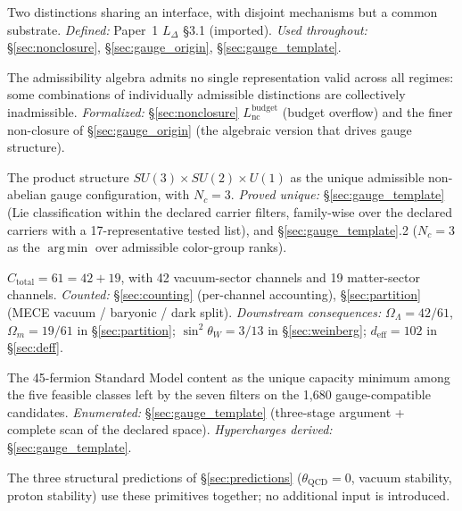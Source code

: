 \documentclass[11pt]{article}
\DeclareMathOperator*{\argmin}{arg\,min}
\begin{document}
\begin{tcolorbox}[apfbox, title={Operational primitives: where each structural term is defined and used}]
\begin{description}[topsep=2pt,itemsep=2pt]
  \item[Co-located distinctions.]  Two distinctions sharing an interface, with disjoint mechanisms but a common substrate.  \emph{Defined:} Paper~1 $L_\Delta$ \S 3.1 (imported).  \emph{Used throughout:} \S\ref{sec:nonclosure}, \S\ref{sec:gauge_origin}, \S\ref{sec:gauge_template}.
  \item[Non-closure.]  The admissibility algebra admits no single representation valid across all regimes: some combinations of individually admissible distinctions are collectively inadmissible.  \emph{Formalized:} \S\ref{sec:nonclosure} $L_{\mathrm{nc}}^{\mathrm{budget}}$ (budget overflow) and the finer non-closure of \S\ref{sec:gauge_origin} (the algebraic version that drives gauge structure).
  \item[Gauge template.]  The product structure $SU(3)\times SU(2)\times U(1)$ as the unique admissible non-abelian gauge configuration, with $N_c = 3$.  \emph{Proved unique:} \S\ref{sec:gauge_template} (Lie classification within the declared carrier filters, family-wise over the declared carriers with a 17-representative tested list), and \S\ref{sec:gauge_template}.2 ($N_c = 3$ as the $\argmin$ over admissible color-group ranks).
  \item[Capacity partition.]  $C_{\mathrm{total}} = 61 = 42 + 19$, with 42 vacuum-sector channels and 19 matter-sector channels.  \emph{Counted:} \S\ref{sec:counting} (per-channel accounting), \S\ref{sec:partition} (MECE vacuum / baryonic / dark split).  \emph{Downstream consequences:} $\Omega_\Lambda = 42/61$, $\Omega_m = 19/61$ in \S\ref{sec:partition}; $\sin^2\theta_W = 3/13$ in \S\ref{sec:weinberg}; $d_{\mathrm{eff}} = 102$ in \S\ref{sec:deff}.
  \item[Fermion template.]  The 45-fermion Standard Model content as the unique capacity minimum among the five feasible classes left by the seven filters on the 1{,}680 gauge-compatible candidates.  \emph{Enumerated:} \S\ref{sec:gauge_template} (three-stage argument + complete scan of the declared space).  \emph{Hypercharges derived:} \S\ref{sec:gauge_template}.
\end{description}

\noindent The three structural predictions of \S\ref{sec:predictions} ($\theta_{\mathrm{QCD}} = 0$, vacuum stability, proton stability) use these primitives together; no additional input is introduced.
\end{tcolorbox}
\end{document}
